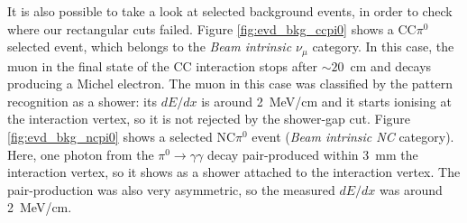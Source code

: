 It is also possible to take a look at selected background events, in order to check where our rectangular cuts failed. Figure \ref{fig:evd_bkg_ccpi0} shows a CC$\pi^0$ selected event, which belongs to the \emph{Beam intrinsic $\nu_{\mu}$} category. In this case, the muon in the final state of the CC interaction stops after $\sim20$~cm and decays producing a Michel electron. The muon in this case was classified by the pattern recognition as a shower: its $dE/dx$ is around 2~MeV/cm and it starts ionising at the interaction vertex, so it is not rejected by the shower-gap cut. 
Figure \ref{fig:evd_bkg_ncpi0} shows a selected NC$\pi^0$ event (\emph{Beam intrinsic NC} category). Here, one photon from the $\pi^0\rightarrow\gamma\gamma$ decay pair-produced within 3~mm the interaction vertex, so it shows as a shower attached to the interaction vertex. The pair-production was also very asymmetric, so the measured $dE/dx$ was around 2~MeV/cm.

